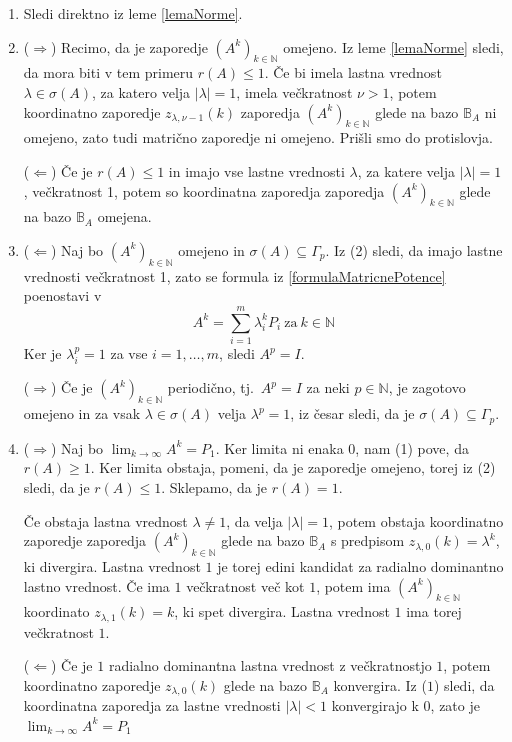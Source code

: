 \documentclass[mat1]{fmfdelo}
\newcommand{\N}{\mathbb N}
\begin{document}
\begin{dokaz}
    \leavevmode
    \begin{enumerate}
        \item Sledi direktno iz leme \ref{lemaNorme}.
        \item ($\Rightarrow$) Recimo, da je zaporedje $(A^k)_{k\in\N}$ omejeno. Iz leme \ref{lemaNorme} sledi, da mora biti v tem primeru $r(A) \leq 1$. Če bi imela lastna vrednost $\lambda \in \sigma(A)$, za katero velja $|\lambda| = 1$, imela večkratnost $\nu > 1$, potem koordinatno zaporedje $z_{\lambda, \nu - 1}(k)$ zaporedja $(A^k)_{k\in\N}$ glede na bazo $\mathbb{B}_A$ ni omejeno, zato tudi matrično zaporedje ni omejeno. Prišli smo do protislovja.
        
        \noindent($\Leftarrow$) Če je $r(A) \leq 1$ in imajo vse lastne vrednosti $\lambda$, za katere velja $|\lambda| = 1$, večkratnost 1, potem so koordinatna zaporedja zaporedja $(A^k)_{k\in\N}$ glede na bazo $\mathbb{B}_A$ omejena.
        \item ($\Leftarrow$) Naj bo $(A^k)_{k\in\N}$ omejeno in $\sigma(A) \subseteq \Gamma_p$. Iz (2) sledi, da imajo lastne vrednosti večkratnost 1, zato se formula iz \eqref{formulaMatricnePotence} poenostavi v
        \begin{equation*}
            A^k = \sum_{i=1}^m \lambda_i^k P_i\ \text{za}\ k\in\N
        \end{equation*}
        Ker je $\lambda_i^p=1$ za vse $i=1,\ldots,m$, sledi $A^p = I$.

        \noindent($\Rightarrow$) Če je $(A^k)_{k\in\N}$ periodično, tj.\ $A^p = I$ za neki $p\in\N$, je zagotovo omejeno in za vsak $\lambda\in\sigma(A)$ velja $\lambda^p = 1$, iz česar sledi, da je $\sigma(A) \subseteq \Gamma_p$.
        \item ($\Rightarrow$) Naj bo $\lim_{k\rightarrow\infty} A^k = P_1$. Ker limita ni enaka 0, nam (1) pove, da $r(A) \geq 1$. Ker limita obstaja, pomeni, da je zaporedje omejeno, torej iz (2) sledi, da je $r(A) \leq 1$. Sklepamo, da je $r(A) = 1$.
        
        Če obstaja lastna vrednost $\lambda \neq 1$, da velja $|\lambda| = 1$, potem obstaja koordinatno zaporedje zaporedja $(A^k)_{k\in\N}$ glede na bazo $\mathbb{B}_A$ s predpisom $z_{\lambda,0}(k) = \lambda^k$, ki divergira. Lastna vrednost $1$ je torej edini kandidat za radialno dominantno lastno vrednost. Če ima $1$ večkratnost več kot $1$, potem ima $(A^k)_{k\in\N}$ koordinato $z_{\lambda,1}(k) = k$, ki spet divergira. Lastna vrednost $1$ ima torej večkratnost $1$.

        \noindent($\Leftarrow$) Če je $1$ radialno dominantna lastna vrednost z večkratnostjo $1$, potem koordinatno zaporedje $z_{\lambda,0}(k)$ glede na bazo $\mathbb{B}_A$ konvergira. Iz ($1$) sledi, da koordinatna zaporedja za lastne vrednosti $|\lambda| < 1$ konvergirajo k 0, zato je $\lim_{k\rightarrow\infty} A^k = P_1$
    \end{enumerate}
\end{dokaz}
\end{document}
